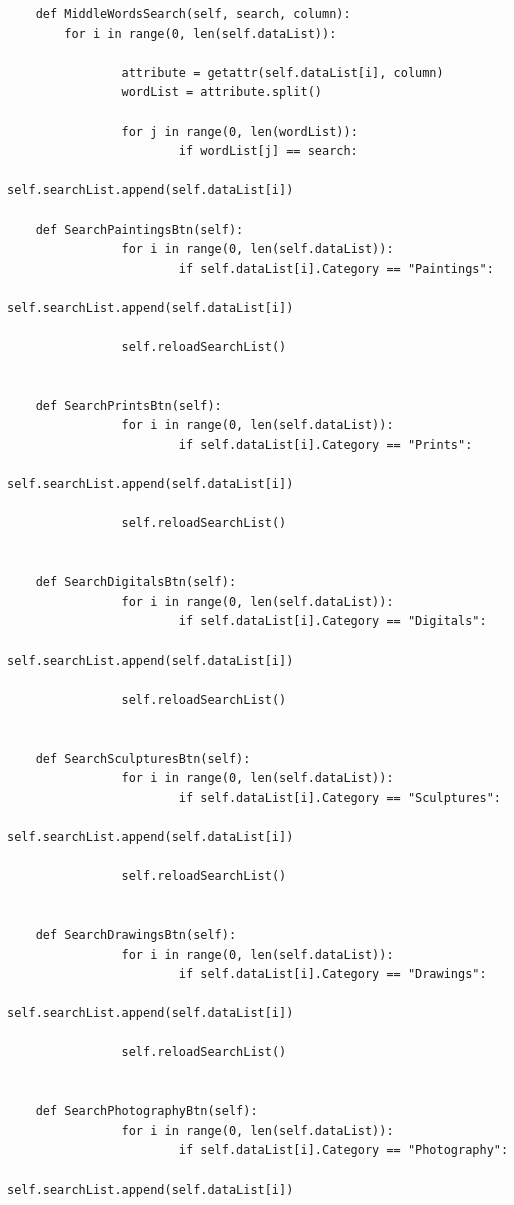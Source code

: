 \documentclass[12pt]{article}
\begin{document}
\begin{verbatim}
    def MiddleWordsSearch(self, search, column):
        for i in range(0, len(self.dataList)):
                
                attribute = getattr(self.dataList[i], column)
                wordList = attribute.split()

                for j in range(0, len(wordList)):
                        if wordList[j] == search:
                                self.searchList.append(self.dataList[i])

    def SearchPaintingsBtn(self):
                for i in range(0, len(self.dataList)):
                        if self.dataList[i].Category == "Paintings":
                                self.searchList.append(self.dataList[i])
                
                self.reloadSearchList()


    def SearchPrintsBtn(self):
                for i in range(0, len(self.dataList)):
                        if self.dataList[i].Category == "Prints":
                                self.searchList.append(self.dataList[i])
                
                self.reloadSearchList()


    def SearchDigitalsBtn(self):
                for i in range(0, len(self.dataList)):
                        if self.dataList[i].Category == "Digitals":
                                self.searchList.append(self.dataList[i])
                
                self.reloadSearchList()


    def SearchSculpturesBtn(self):
                for i in range(0, len(self.dataList)):
                        if self.dataList[i].Category == "Sculptures":
                                self.searchList.append(self.dataList[i])
                
                self.reloadSearchList()


    def SearchDrawingsBtn(self):
                for i in range(0, len(self.dataList)):
                        if self.dataList[i].Category == "Drawings":
                                self.searchList.append(self.dataList[i])
                
                self.reloadSearchList()


    def SearchPhotographyBtn(self):
                for i in range(0, len(self.dataList)):
                        if self.dataList[i].Category == "Photography":
                                self.searchList.append(self.dataList[i])
                

\end{verbatim}
\end{document}
